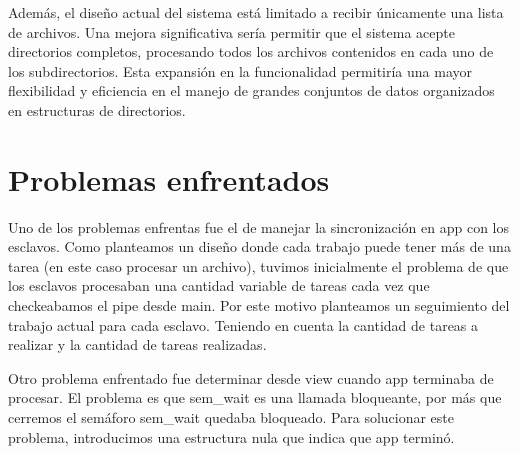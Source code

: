 \documentclass{article}
\begin{document}
Además, el diseño actual del sistema está limitado a recibir únicamente una lista de archivos. Una mejora significativa sería permitir que el sistema acepte directorios completos, procesando todos los archivos contenidos en cada uno de los subdirectorios. Esta expansión en la funcionalidad permitiría una mayor flexibilidad y eficiencia en el manejo de grandes conjuntos de datos organizados en estructuras de directorios.

\section{Problemas enfrentados}

Uno de los problemas enfrentas fue el de manejar la sincronización en app con los esclavos. Como planteamos un diseño donde cada trabajo puede tener más de una tarea (en este caso procesar un archivo), tuvimos inicialmente el problema de que los esclavos procesaban una cantidad variable de tareas cada vez que checkeabamos el pipe desde main. Por este motivo planteamos un seguimiento del trabajo actual para cada esclavo. Teniendo en cuenta la cantidad de tareas a realizar y la cantidad de tareas realizadas.

Otro problema enfrentado fue determinar desde view cuando app terminaba de procesar. El problema es que sem\_wait es una llamada bloqueante, por más que cerremos el semáforo sem\_wait quedaba bloqueado. Para solucionar este problema, introducimos una estructura nula que indica que app terminó. 
\end{document}
